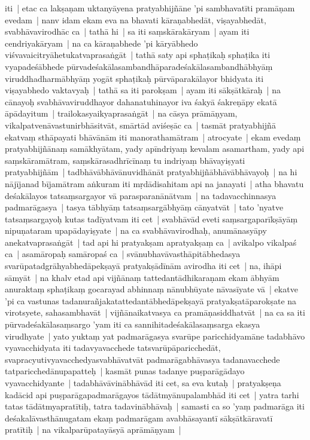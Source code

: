 \documentclass[article,12pt,a4paper]{memoir}%
\newcounter{parCount}
\begin{document}
	  \pstart \leavevmode%
	iti | etac ca lakṣaṇam uktanyāyena pratyabhijñāne 'pi sambhavatīti pramāṇam evedam | \label{thakur75-113.14} nanv idam ekam eva na bhavati kāraṇabhedāt, viṣayabhedāt, svabhāvavirodhāc ca | \label{thakur75-113.14a} tathā hi | sa iti saṃskārakāryam | ayam iti cendriyakāryam | na ca kāraṇabhede 'pi kāryābhedo viśvavaicitryāhetukatvaprasaṅgāt | \label{thakur75-113.16} tathā saty api sphaṭikaḥ sphaṭika iti vyapadeśābhede pūrvadeśakālasambandhāparadeśakālasambandhābhyāṃ viruddhadharmābhyāṃ yogāt sphaṭikaḥ pūrvāparakālayor bhidyata iti viṣayabhedo vaktavyaḥ | \label{thakur75-113.18} tathā sa iti parokṣam | ayam iti sākṣātkāraḥ | na cānayoḥ svabhāvaviruddhayor dahanatuhinayor iva śakyā śakreṇāpy ekatā āpādayitum | trailokasyaikyaprasaṅgāt | \label{thakur75-113.20} na cāsya prāmāṇyam, vikalpatvenāvastunirbhāsitvāt, smārtād aviśeṣāc ca | tasmāt pratyabhijñā ekatvaṃ sthāpayati bhāvānām iti manorathamātram | \label{thakur75-113.23} atrocyate | ekam evedaṃ pratyabhijñānaṃ samākhyātam, \label{thakur75-113.23a} yady apīndriyaṃ kevalam asamartham, yady api saṃskāramātram, saṃskārasadhrīcīnaṃ tu indriyaṃ bhāvayiṣyati pratyabhijñām | tadbhāvābhāvānuvidhānāt pratyabhijñābhāvābhāvayoḥ | na hi nājījanad bījamātram aṅkuram iti mṛdādisahitam api na janayati | \label{thakur75-113.26} atha bhavatu deśakālayos tatsaṃsargayor vā parasparanānātvam | na tadavacchinnasya padmarāgasya | tasya tābhyāṃ tatsaṃsargābhyāṃ cānyatvāt | \label{thakur75-113.29} tato 'nyatve tatsaṃsargayoḥ kutas tadīyatvam iti cet | svabhāvād eveti saṃsargaparīkṣāyāṃ nipuṇataram upapādayiṣyate | \label{thakur75-113.30} na ca svabhāvavirodhaḥ, anumānasyāpy anekatvaprasaṅgāt | tad api hi pratyakṣam apratyakṣaṃ ca | avikalpo vikalpaś ca | asamāropaḥ samāropaś ca | \label{thakur75-113.32} svānubhavāvasthāpitābhedasya svarūpatadgrāhyabhedāpekṣayā pratyakṣādīnām avirodha iti cet | na, ihāpi sāmyāt | na khalv etad api vijñānaṃ tattedantādhikaraṇam ekam ābhyām anuraktaṃ sphaṭikaṃ gocarayad abhinnaṃ nānubhūyate nāvasīyate vā | ekatve 'pi ca vastunas tadanurañjakatattedantābhedāpekṣayā pratyakṣatāparokṣate na virotsyete, sahasambhavāt | vijñānaikatvasya ca pramāṇasiddhatvāt | \label{thakur75-114.3} na ca sa iti pūrvadeśakālasaṃsargo 'yam iti ca sannihitadeśakālasaṃsarga ekasya virudhyate | yato yuktaṃ yat padmarāgasya svarūpe paricchidyamāne tadabhāvo vyavacchidyata iti tadavyavacchede tatsvarūpāparicchedāt, svapracyutivyavacchedyasvabhāvatvāt padmarāgabhāvasya tadanavacchede tatparicchedānupapatteḥ | \label{thakur75-114.8} kasmāt punas tadanye puṣparāgādayo vyavacchidyante | tadabhāvāvinābhāvād iti cet, sa eva kutaḥ | pratyakṣeṇa kadācid api puṣparāgapadmarāgayos tādātmyānupalambhād iti cet | yatra tarhi tatas tādātmyapratītiḥ, tatra tadavinābhāvaḥ | samasti ca so 'yaṃ padmarāga iti deśakalāvasthānugatam ekaṃ padmarāgam avabhāsayantī sākṣātkāravatī pratītiḥ | \label{thakur75-114.12} na vikalparūpatayāsyā aprāmāṇyam | 
\end{document}
